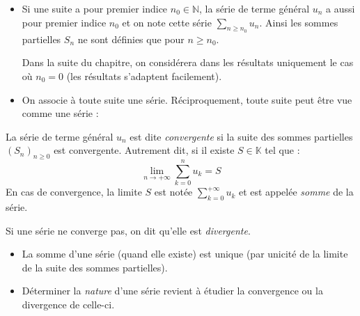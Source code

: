 \documentclass[french,11pt,twoside]{VcCours}
\newcommand{\Sum}[2]{\ensuremath{\textstyle{\sum\limits_{#1}^{#2}}}}
\begin{document}
\begin{Remarques}{}
	\begin{itemize}
\item Si une suite a pour premier indice $n_0 \in \mathbb{N}$, la série de terme général $u_n$ a aussi pour premier indice $n_0$ et on note cette série $\Sum{n \geq n_0}{} u_n$. Ainsi les sommes partielles $S_n$ ne sont définies que pour $n \geq n_0$. 

\medskip

Dans la suite du chapitre, on considérera dans les résultats uniquement le cas où $n_0=0$ (les résultats s'adaptent facilement).
\item On associe à toute suite une série. Réciproquement, toute suite peut être vue comme une série :

%

\vspace{4cm}
\end{itemize}
\end{Remarques}

\begin{Definition}{}
La série de terme général $u_n$ est dite \emph{convergente} si la suite des sommes partielles $(S_n)_{n \geq 0}$ est convergente. Autrement dit, si il existe $S \in \mathbb{K}$ tel que :
$$ \lim_{n \rightarrow + \infty} \sum_{k=0}^n u_k = S $$
En cas de convergence, la limite $S$ est notée $\Sum{k=0}{+ \infty} u_k$ et est appelée \emph{somme} de la série.
\end{Definition}

\begin{Definition}{} Si une série ne converge pas, on dit qu'elle est \emph{divergente}.
\end{Definition}

\begin{Remarques}{}
	\begin{itemize}
\item La somme d'une série (quand elle existe) est unique (par unicité de la limite de la suite des sommes partielles).
\item Déterminer la \emph{nature} d'une série revient à étudier la convergence ou la divergence de celle-ci.
\end{itemize}
\end{Remarques}
\end{document}

